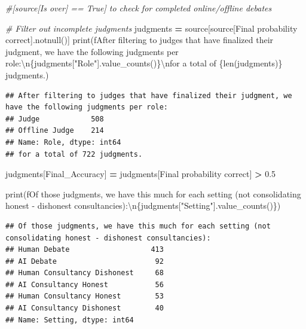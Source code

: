 \documentclass[
]{article}
\newenvironment{Shaded}{\begin{snugshade}}{\end{snugshade}}
\newcommand{\BuiltInTok}[1]{#1}
\newcommand{\CharTok}[1]{\textcolor[rgb]{0.31,0.60,0.02}{#1}}
\newcommand{\CommentTok}[1]{\textcolor[rgb]{0.56,0.35,0.01}{\textit{#1}}}
\newcommand{\FloatTok}[1]{\textcolor[rgb]{0.00,0.00,0.81}{#1}}
\newcommand{\NormalTok}[1]{#1}
\newcommand{\OperatorTok}[1]{\textcolor[rgb]{0.81,0.36,0.00}{\textbf{#1}}}
\newcommand{\SpecialCharTok}[1]{\textcolor[rgb]{0.00,0.00,0.00}{#1}}
\newcommand{\SpecialStringTok}[1]{\textcolor[rgb]{0.31,0.60,0.02}{#1}}
\newcommand{\StringTok}[1]{\textcolor[rgb]{0.31,0.60,0.02}{#1}}
\begin{document}
\begin{Shaded}
\begin{Highlighting}[]
\CommentTok{\#[source[\textquotesingle{}Is over\textquotesingle{}] == True] to check for completed online/offline debates}

\CommentTok{\# Filter out incomplete judgments}
\NormalTok{judgments }\OperatorTok{=}\NormalTok{ source[source[}\StringTok{\textquotesingle{}Final probability correct\textquotesingle{}}\NormalTok{].notnull()]}
\BuiltInTok{print}\NormalTok{(}\SpecialStringTok{f\textquotesingle{}After filtering to judges that have finalized their judgment, we have the following judgments per role:}\CharTok{\textbackslash{}n}\SpecialCharTok{\{}\NormalTok{judgments[}\StringTok{"Role"}\NormalTok{]}\SpecialCharTok{.}\NormalTok{value\_counts()}\SpecialCharTok{\}}\CharTok{\textbackslash{}n}\SpecialStringTok{for a total of }\SpecialCharTok{\{}\BuiltInTok{len}\NormalTok{(judgments)}\SpecialCharTok{\}}\SpecialStringTok{ judgments.\textquotesingle{}}\NormalTok{)}
\end{Highlighting}
\end{Shaded}

\begin{verbatim}
## After filtering to judges that have finalized their judgment, we have the following judgments per role:
## Judge            508
## Offline Judge    214
## Name: Role, dtype: int64
## for a total of 722 judgments.
\end{verbatim}

\begin{Shaded}
\begin{Highlighting}[]
\NormalTok{judgments[}\StringTok{\textquotesingle{}Final\_Accuracy\textquotesingle{}}\NormalTok{] }\OperatorTok{=}\NormalTok{ judgments[}\StringTok{\textquotesingle{}Final probability correct\textquotesingle{}}\NormalTok{] }\OperatorTok{\textgreater{}} \FloatTok{0.5}

\BuiltInTok{print}\NormalTok{(}\SpecialStringTok{f\textquotesingle{}Of those judgments, we have this much for each setting (not consolidating honest {-} dishonest consultancies):}\CharTok{\textbackslash{}n}\SpecialCharTok{\{}\NormalTok{judgments[}\StringTok{"Setting"}\NormalTok{]}\SpecialCharTok{.}\NormalTok{value\_counts()}\SpecialCharTok{\}}\SpecialStringTok{\textquotesingle{}}\NormalTok{)}
\end{Highlighting}
\end{Shaded}

\begin{verbatim}
## Of those judgments, we have this much for each setting (not consolidating honest - dishonest consultancies):
## Human Debate                   413
## AI Debate                       92
## Human Consultancy Dishonest     68
## AI Consultancy Honest           56
## Human Consultancy Honest        53
## AI Consultancy Dishonest        40
## Name: Setting, dtype: int64
\end{verbatim}
\end{document}
